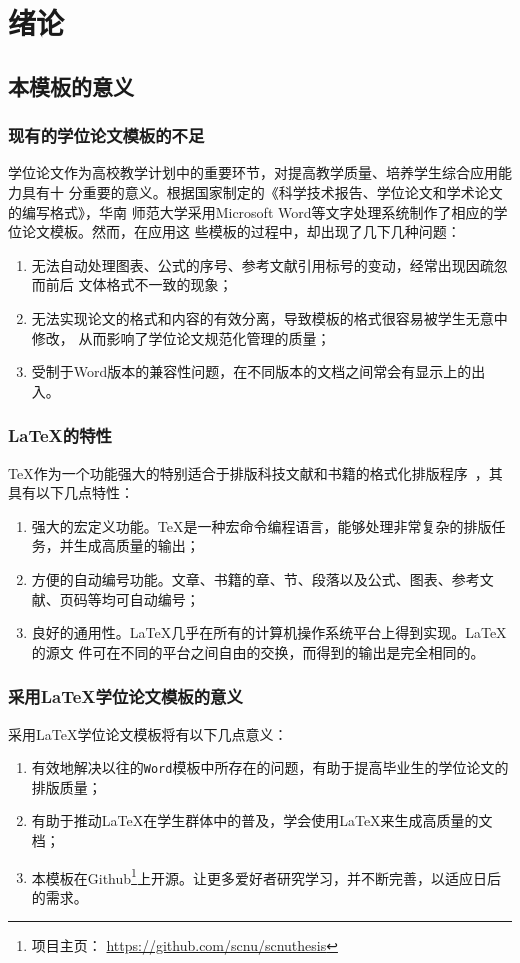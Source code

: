 \chapter{绪论}

\section{本模板的意义}

\subsection{现有的学位论文模板的不足}
学位论文作为高校教学计划中的重要环节，对提高教学质量、培养学生综合应用能力具有十%
分重要的意义。根据国家制定的《科学技术报告、学位论文和学术论文的编写格式》，华南%
师范大学采用Microsoft Word等文字处理系统制作了相应的学位论文模板。然而，在应用这%
些模板的过程中，却出现了几下几种问题\cite{Maddage2009}：
\begin{enumerate}
\item 无法自动处理图表、公式的序号、参考文献引用标号的变动，经常出现因疏忽而前后%
  文体格式不一致的现象；
\item 无法实现论文的格式和内容的有效分离，导致模板的格式很容易被学生无意中修改，%
  从而影响了学位论文规范化管理的质量；
\item 受制于Word版本的兼容性问题，在不同版本的文档之间常会有显示上的出入。%
\end{enumerate}

\subsection{\LaTeX{}的特性}
\TeX{}作为一个功能强大的特别适合于排版科技文献和书籍的格式化排版程序~，其具有以下几点特性：
\begin{enumerate}
\item 强大的宏定义功能。\TeX{}是一种宏命令编程语言，能够处理非常复杂的排版任务，并生成高质量的输出；
\item 方便的自动编号功能。文章、书籍的章、节、段落以及公式、图表、参考文献、页码等均可自动编号；
\item 良好的通用性。\LaTeX{}几乎在所有的计算机操作系统平台上得到实现。\LaTeX{}的源文%
  件可在不同的平台之间自由的交换，而得到的输出是完全相同的。
\end{enumerate}




\subsection{采用\LaTeX{}学位论文模板的意义}
采用\LaTeX{}学位论文模板将有以下几点意义：
\begin{enumerate}
\item 有效地解决以往的\verb|Word|模板中所存在的问题，有助于提高毕业生的学位论文的排版质量；
\item 有助于推动LaTeX在学生群体中的普及，学会使用\LaTeX{}来生成高质量的文档；
\item 本模板在Github\footnote{项目主页：
    \url{https://github.com/scnu/scnuthesis}}上开源。让更多爱好者研究学习，并不断完善，以适应日后的需求。
\end{enumerate}


